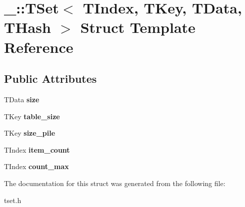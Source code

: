 \hypertarget{struct___1_1_t_set}{}\section{\+\_\+\+:\+:T\+Set$<$ T\+Index, T\+Key, T\+Data, T\+Hash $>$ Struct Template Reference}
\label{struct___1_1_t_set}
\subsection*{Public Attributes}
\begin{DoxyCompactItemize}
\item 
\mbox{\label{struct___1_1_t_set_a7e0c5e6d9871a09c692bec2c40103c11}} 
T\+Data {\bfseries size}
\item 
\mbox{\label{struct___1_1_t_set_a245872eea0c8cdd3783b240153c19641}} 
T\+Key {\bfseries table\+\_\+size}
\item 
\mbox{\label{struct___1_1_t_set_a63dac2a240775013d9f65c3acdaefce3}} 
T\+Key {\bfseries size\+\_\+pile}
\item 
\mbox{\label{struct___1_1_t_set_a8735fd1260cb438c0bf7e97fb1e7923f}} 
T\+Index {\bfseries item\+\_\+count}
\item 
\mbox{\label{struct___1_1_t_set_a463abcab414ff6b33ef3bfde27d8894b}} 
T\+Index {\bfseries count\+\_\+max}
\end{DoxyCompactItemize}


The documentation for this struct was generated from the following file\+:\begin{DoxyCompactItemize}
\item 
tset.\+h\end{DoxyCompactItemize}

